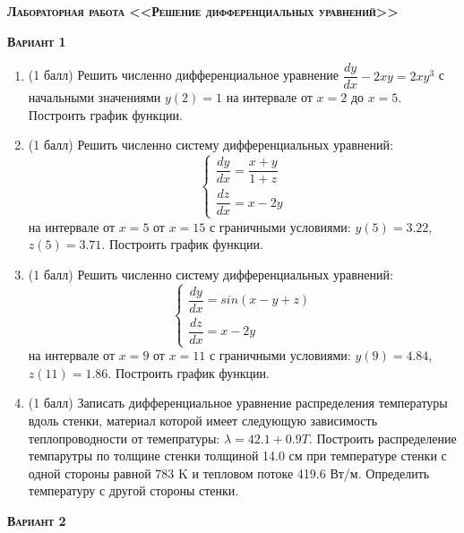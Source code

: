 \textsc{\textbf{Лабораторная работа <<Решение дифференциальных уравнений>>}}

\textsc{\textbf{Вариант 1}}
\begin{enumerate}
\item (1 балл) Решить численно дифференциальное уравнение $\dfrac{dy}{dx}-2xy=2xy^3              $ с начальными значениями $y(     2)=     1$ на интервале от $x=     2$ до $x=     5$. Построить график функции.\item (1 балл) Решить численно систему дифференциальных уравнений:
 \begin{equation*}
\left\{
\begin{gathered}
\dfrac{dy}{dx}=\dfrac{x+y}{1+z}      \\
\dfrac{dz}{dx}=x-2y                  
\end{gathered}
\right.
\end{equation*}
на интервале от $x= 5$ от $x=15$ с граничными условиями: $y( 5)=3.22$, $z( 5)=3.71$. Построить график функции. 
\item (1 балл) Решить численно систему дифференциальных уравнений:
 \begin{equation*}
\left\{
\begin{gathered}
\dfrac{dy}{dx}=sin(x-y+z)\\
\dfrac{dz}{dx}=x-2y
\end{gathered}
\right.
\end{equation*}
на интервале от $x= 9$ от $x=11$ с граничными условиями: $y( 9)=4.84$, $z(11)=1.86$.  Построить график функции. 
\item (1 балл)  Записать дифференциальное уравнение распределения температуры вдоль стенки, материал которой имеет следующую зависимость теплопроводности от темепратуры: $\lambda=42.1+0.9T$. Построить распределение темпарутры по толщине стенки толщиной 14.0 см при температуре стенки с одной стороны равной  783 K и тепловом потоке 419.6 Вт/м. Определить температуру с другой стороны стенки.

 \end{enumerate}
\textsc{\textbf{Вариант 2}}
